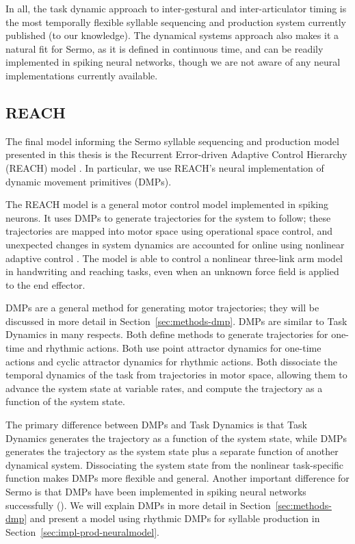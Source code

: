In all, the task dynamic approach
to inter-gestural and inter-articulator timing
is the most temporally flexible
syllable sequencing and production system
currently published
(to our knowledge).
The dynamical systems approach
also makes it a natural fit for Sermo,
as it is defined in continuous time,
and can be readily implemented
in spiking neural networks,
though we are not aware of any
neural implementations currently available.

\subsection{REACH}

The final model informing
the Sermo syllable sequencing
and production model presented
in this thesis is the
Recurrent Error-driven Adaptive Control Hierarchy (REACH)
model \cite{dewolf2015}.
In particular, we use REACH's
neural implementation
of dynamic movement primitives (DMPs).

The REACH model is a general motor control
model implemented in spiking neurons.
It uses DMPs  to generate trajectories
for the system to follow;
these trajectories are mapped into
motor space using operational space control,
and unexpected changes in system dynamics
are accounted for online
using nonlinear adaptive control
\cite{slotine1987}.
The model is able to control
a nonlinear three-link arm model
in handwriting and reaching tasks,
even when an unknown force field
is applied to the end effector.

DMPs are a general method for generating motor trajectories;
they will be discussed in more detail
in Section~\ref{sec:methods-dmp}.
DMPs are similar to Task Dynamics in many respects.
Both define methods to generate trajectories
for one-time and rhythmic actions.
Both use point attractor dynamics
for one-time actions
and cyclic attractor dynamics
for rhythmic actions.
Both dissociate the temporal dynamics
of the task from trajectories
in motor space,
allowing them to advance the system state
at variable rates,
and compute the trajectory
as a function of the system state.

The primary difference between DMPs and Task Dynamics
is that Task Dynamics generates
the trajectory as a function
of the system state,
while DMPs generates the trajectory
as the system state
plus a separate function
of another dynamical system.
Dissociating the system state
from the nonlinear task-specific function
makes DMPs more flexible and general.
Another important difference for Sermo
is that DMPs have been implemented
in spiking neural networks successfully
(\cite{dewolf2014}).
We will explain DMPs in more detail
in Section~\ref{sec:methods-dmp} and present a model
using rhythmic DMPs for syllable production
in Section~\ref{sec:impl-prod-neuralmodel}.

